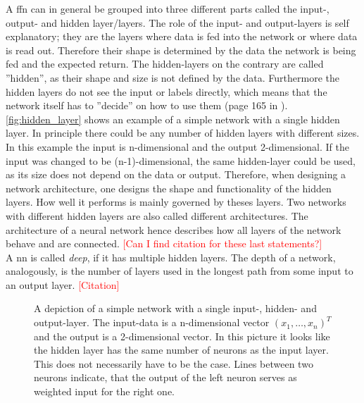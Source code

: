 A \gls{ffn} can in general be grouped into three different parts called the input-, output- and hidden layer/layers. The role of the input- and output-layers is self explanatory; they are the layers where data is fed into the network or where data is read out. Therefore their shape is determined by the data the network is being fed and the expected return. The hidden-layers on the contrary are called ''hidden'', as their shape and size is not defined by the data. Furthermore the hidden layers do not see the input or labels directly, which means that the network itself has to ''decide'' on how to use them (page 165 in \cite{deep_learning_book}). \autoref{fig:hidden_layer} shows an example of a simple network with a single hidden layer. In principle there could be any number of hidden layers with different sizes. In this example the input is n-dimensional and the output 2-dimensional. If the input was changed to be (n-1)-dimensional, the same hidden-layer could be used, as its size does not depend on the data or output. Therefore, when designing a network architecture, one designs the shape and functionality of the hidden layers. How well it performs is mainly governed by theses layers. Two networks with different hidden layers are also called different architectures. The architecture of a neural network hence describes how all layers of the network behave and are connected. \textcolor{red}{[Can I find citation for these last statements?]}\\
A \gls{nn} is called \emph{deep}, if it has multiple hidden layers. The depth of a network, analogously, is the number of layers used in the longest path from some input to an output layer. \textcolor{red}{[Citation]}
\begin{figure}
\centering

\caption[Simple neural network]{A depiction of a simple network with a single input-, hidden- and output-layer. The input-data is a n-dimensional vector ${(x_1, \dotsc, x_n)}^T$ and the output is a 2-dimensional vector. In this picture it looks like the hidden layer has the same number of neurons as the input layer. This does not necessarily have to be the case. Lines between two neurons indicate, that the output of the left neuron serves as weighted input for the right one.}\label{fig:hidden_layer}
\end{figure}

